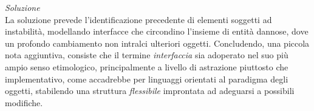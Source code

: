 \documentclass{article}
\begin{document}
\textit{Soluzione}\\
La soluzione prevede l'identificazione precedente di elementi soggetti ad instabilità, modellando interfacce che circondino l'insieme di entità dannose, dove un profondo cambiamento non intralci ulteriori oggetti. Concludendo, una piccola nota aggiuntiva, consiste che il termine \textit{interfaccia} sia adoperato nel suo più ampio senso etimologico, principalmente a livello di astrazione piuttosto che implementativo, come accadrebbe per linguaggi orientati al paradigma degli oggetti, stabilendo una struttura \textit{flessibile} improntata ad adeguarsi a possibili modifiche.
\end{document}
